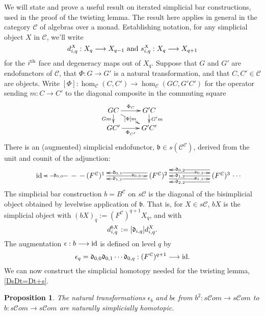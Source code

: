 \documentclass[11pt]{amsart}
\theoremstyle{plain}
\newtheorem{prop}[thm]{Proposition}
\theoremstyle{definition}
\renewcommand{\to}{\longrightarrow}
\newcommand{\scrC}{\mathscr{C}}
\newcommand{\fraks}{\mathfrak{s}}
\newcommand{\frakd}{\mathfrak{d}}
\newcommand{\frakb}{\mathfrak{b}}
\newcommand{\calC}{\mathcal{C}}
\theoremstyle{plain}
\newcommand{\Id}{\textup{id}}
\newcommand{\algcat}{{\scrC\!\textit{om}}}%
\newcommand{\algCat}{\calC}
\newcommand{\trip}[3]{{#1}_{\smash{#2}}^{\smash{#3}}}
\newcommand{\barConstructionMightAbbreviate}{b}
\begin{document}
\begin{Bousfield-Kan spectral sequence}
We will state and prove a useful result on iterated simplicial bar constructions, used in the proof of the twisting lemma. The result here applies in general in the category $\calC$ of algebras over a monad. Establishing notation, for any simplicial object $X$ in $\algCat$, we'll write 
\[\trip{d}{i,q}{X}:X_q\to X_{q-1}\textup{\ and\ }\trip{s}{i,q}{X}:X_q\to X_{q+1}\]
for the $i^\textup{th}$ face and degeneracy maps out of $X_q$. Suppose that $G$ and $G'$ are endofunctors of $\algCat$, that $\Phi:G\to G'$ is a natural transformation, and that $C,C'\in\algCat$ are objects. Write $[\Phi]:\hom_{\algCat}(C,C')\to\hom_{\algCat}(GC,G'C')$ for the operator sending $m:C\to C'$ to the diagonal composite in the commuting square
\[\xymatrix@R=4mm{
GC
\ar[r]^-{\Phi_C}
\ar[d]_-{Gm}
\ar[dr]|-{[\Phi]m}
&%
G'C
\ar[d]^-{G'm}
\\%
GC'
\ar[r]_-{\Phi_{C'}}
&%
G'C'
}\]
There is an (augmented) simplicial endofunctor, $\frakb\in s({\algCat}^{\algCat})$, derived from the unit and counit of the adjunction:
\[\vcenter{
\def\labelstyle{\scriptstyle}
\xymatrix@C=2cm@1{
{\ \Id\,}
&
\,(F^{\algCat})^1\,
\ar@{-->}[l]|(.65){\frakd_{0,0}}
\ar[r]|(.65){\fraks_{0,0}}
&
\,(F^{\algCat})^2\,
\ar@<-1ex>[l]|(.65){\frakd_{0,1}}
\ar@<+1ex>[l]|(.65){\frakd_{1,1}}
\ar@<+1ex>[r]|(.65){\fraks_{0,1}}
\ar@<-1ex>[r]|(.65){\fraks_{1,1}}
&
\,(F^{\algCat})^3\,\makebox[0cm][l]{\,$\cdots $}
\ar[l]|(.65){\frakd_{1,2}}
\ar@<-2ex>[l]|(.65){\frakd_{0,2}}
\ar@<+2ex>[l]|(.65){\frakd_{2,2}}
}}\]
The simplicial bar construction $\barConstructionMightAbbreviate =B^{\algCat}$ on $s\algCat$ is the diagonal of the bisimplicial object obtained by levelwise application of $\frakb$. That is, for $X\in s\algCat$, $\barConstructionMightAbbreviate X$ is the simplicial object with $(\barConstructionMightAbbreviate X)_q:=(F^{\algCat})^{q+1}X_q$, and with
\[\trip{d}{i,q}{\barConstructionMightAbbreviate X}:=[\frakd_{i,q}]\trip{d}{i,q}{X}.\]
The augmentation $\epsilon:\barConstructionMightAbbreviate \to \Id $ is defined on level $q$ by 
\[\epsilon_q=\frakd_{0,0}\frakd_{0,1}\cdots \frakd_{0,q}:(F^{\algCat})^{q+1}\to \Id .\]
We can now construct the simplicial homotopy needed for the twisting lemma, \ref{DsDt=Dt+s}.
\begin{prop}\label{IteratedBarConstructionHomotopy}
The natural transformations $\epsilon_\barConstructionMightAbbreviate $ and $\barConstructionMightAbbreviate \epsilon$ from $\barConstructionMightAbbreviate ^2:s\algcat\to s\algcat$ to $\barConstructionMightAbbreviate :s\algcat\to s\algcat$ are naturally simplicially homotopic.
\end{prop}


\end{Bousfield-Kan spectral sequence}
\end{document}

